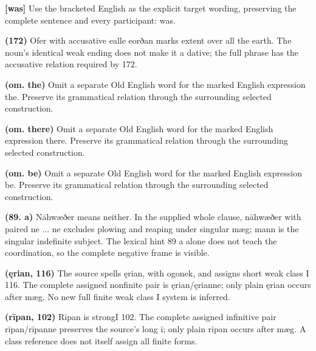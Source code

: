 \textbf{[was]} Use the bracketed English as the explicit target wording, preserving the complete sentence and every participant: was.

\textbf{(172)} Ofer with accusative ealle eorðan marks extent over all the earth. The noun’s identical weak ending does not make it a dative; the full phrase has the accusative relation required by 172.

\textbf{(om. the)} Omit a separate Old English word for the marked English expression the. Preserve its grammatical relation through the surrounding selected construction.

\textbf{(om. there)} Omit a separate Old English word for the marked English expression there. Preserve its grammatical relation through the surrounding selected construction.

\textbf{(om. be)} Omit a separate Old English word for the marked English expression be. Preserve its grammatical relation through the surrounding selected construction.

\textbf{(89. a)} Nāhwæðer means neither. In the supplied whole clause, nāhwæðer with paired ne ... ne excludes plowing and reaping under singular mæg; mann is the singular indefinite subject. The lexical hint 89 a alone does not teach the coordination, so the complete negative frame is visible.

\textbf{(ęrian, 116)} The source spells ęrian, with ogonek, and assigns short weak class I 116. The complete assigned nonfinite pair is ęrian/\allowbreak{}ęrianne; only plain ęrian occurs after mæg. No new full finite weak class I system is inferred.

\textbf{(rīpan, 102)} Rīpan is strongI 102. The complete assigned infinitive pair rīpan/\allowbreak{}rīpanne preserves the source’s long ī; only plain rīpan occurs after mæg. A class reference does not itself assign all finite forms.

